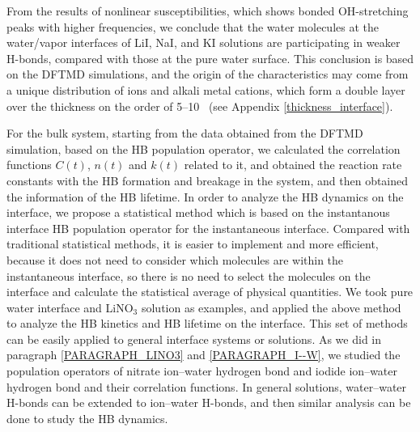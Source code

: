 From the results of nonlinear susceptibilities, which shows bonded OH-stretching peaks with higher frequencies, 
we conclude that the water molecules at the water/vapor interfaces of LiI, NaI, and KI solutions are participating 
in weaker H-bonds, compared with those at the pure water surface. 
This conclusion is based on the DFTMD simulations, and %
the origin of the characteristics may come from a unique distribution of \I ions and alkali metal cations, 
which form a double layer \cite{Shultz2010} over the thickness on the order of 5--10 \A\ (see Appendix \ref{thickness_interface}).

For the bulk system, starting from the data obtained from the DFTMD simulation, based on the HB population operator, 
we calculated the correlation functions $C(t)$, $n(t)$ and $k(t)$ related to it, and obtained the reaction rate constants with the HB formation and breakage in the system, 
and then obtained the information of the HB lifetime. In order to analyze the HB dynamics on the interface, 
we propose a statistical method which is based on the instantanous interface HB population operator for the instantaneous interface.
Compared with traditional statistical methods, it is easier to implement and more efficient, 
because it does not need to consider which molecules are within the instantaneous interface, 
so there is no need to select the molecules on the interface and calculate the statistical average of physical quantities. 
We took pure water interface and LiNO$_3$ solution as examples, and applied the above method to analyze the HB kinetics and HB lifetime on the interface. 
This set of methods can be easily applied to general interface systems or solutions.
As we did in paragraph \ref{PARAGRAPH_LINO3} and \ref{PARAGRAPH_I--W}, we studied the population operators of nitrate ion--water hydrogen bond 
and iodide ion--water hydrogen bond and their correlation functions. In general solutions, water--water H-bonds can be extended to ion--water H-bonds, 
and then similar analysis can be done to study the HB dynamics.

